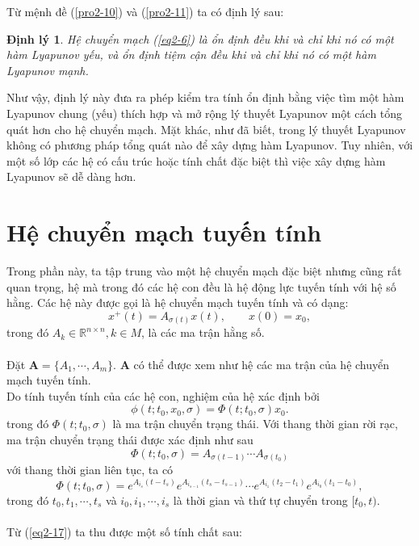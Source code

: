 \documentclass[14pt,a4paper,oneside]{report}		%
\newtheorem{theorem}{Định lý}[chapter]
\theoremstyle{definition}
\begin{document}
Từ mệnh đề (\ref{pro2-10}) và (\ref{pro2-11}) ta có định lý sau:
\begin{theorem} \label{th2-10}
Hệ chuyển mạch (\ref{eq2-6}) là ổn định đều khi và chỉ khi nó có một hàm Lyapunov yếu, và ổn định tiệm cận đều khi và chỉ khi nó có một hàm Lyapunov mạnh.
\end{theorem}

Như vậy, định lý này đưa ra phép kiểm tra tính ổn định bằng việc tìm một hàm Lyapunov chung (yếu) thích hợp và mở rộng lý thuyết Lyapunov một cách tổng quát hơn cho hệ chuyển mạch. Mặt khác, như đã biết, trong lý thuyết Lyapunov không có phương pháp tổng quát nào để xây dựng hàm Lyapunov. Tuy nhiên, với một số lớp các hệ có cấu trúc hoặc tính chất đặc biệt thì việc xây dựng hàm Lyapunov sẽ dễ dàng hơn.

\section{Hệ chuyển mạch tuyến tính}
Trong phần này, ta tập trung vào một hệ chuyển mạch đặc biệt nhưng cũng rất quan trọng, hệ mà trong đó các hệ con đều là hệ động lực tuyến tính với hệ số hằng. Các hệ này được gọi là hệ chuyển mạch tuyến tính và có dạng:
\begin{equation} \label{eq2-16}
x^+(t) = A_{\sigma (t)}x(t), \qquad x(0) = x_0,
\end{equation}
trong đó $A_k\in\mathbb{R}^{n\times n}, k\in M$, là các ma trận hằng số.\\\\
Đặt $\mathbf{A} = \{A_1,\cdots,A_m\}$. $\mathbf{A}$ có thể được xem như hệ các ma trận của hệ chuyển mạch tuyến tính. \\
Do tính tuyến tính của các hệ con, nghiệm của hệ xác định bởi
\begin{equation} \label{eq2-17}
\phi (t;t_0,x_0,\sigma)=\Phi (t;t_0,\sigma)x_0.
\end{equation}
trong đó $\Phi (t;t_0,\sigma)$ là ma trận chuyển trạng thái. Với thang thời gian rời rạc, ma trận chuyển trạng thái được xác định như sau
$$\Phi (t;t_0,\sigma)=A_{\sigma (t-1)}\cdots A_{\sigma (t_0)}$$
với thang thời gian liên tục, ta có
$$\Phi (t;t_0,\sigma )=e^{A_{i_s}(t-t_s)}e^{A_{i_{s-1}}(t_s-t_{s-1})}\cdots e^{A_{i_1}(t_2-t_1)}e^{A_{i_0}(t_1-t_0)},$$
trong đó $t_0,t_1,\cdots ,t_s$ và $i_0,i_1,\cdots,i_s$ là thời gian và thứ tự chuyển trong $[t_0,t)$.\\\\
Từ (\ref{eq2-17}) ta thu được một số tính chất sau:
\end{document}

